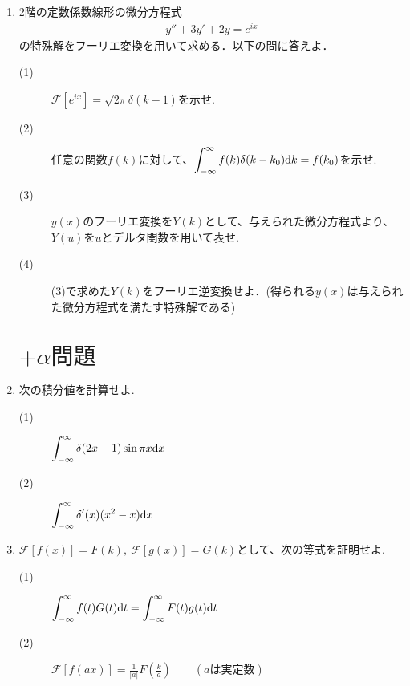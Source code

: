 \documentclass[11pt]{jsarticle}
\begin{document}
\begin{enumerate}
\newpage
\item 2階の定数係数線形の微分方程式
\begin{eqnarray*}
\label{a}
y''+3y'+2y=e^{ix}
\end{eqnarray*}
の特殊解をフーリエ変換を用いて求める．以下の問に答えよ．
\begin{description}
\item[(1)] $\mathcal{F}[e^{ix}]=\sqrt{2\pi}\delta (k-1)$を示せ.
\item[(2)] 任意の関数$f(k)$に対して、$\displaystyle{\int_{-\infty}^{\infty} f(k)\delta (k-k_0){\rm d}k=f(k_0)}$を示せ.
\newpage
\item[(3)] $y(x)$のフーリエ変換を$Y(k)$として、与えられた微分方程式より、$Y(u)$を$u$とデルタ関数を用いて表せ.
\item[(4)] (3)で求めた$Y(k)$をフーリエ逆変換せよ．(得られる$y(x)$は与えられた微分方程式を満たす特殊解である)
\end{description}



\newpage
\section*{$+\alpha 問題$}
\item 次の積分値を計算せよ.\\
\begin{description}
\item[(1)] $\displaystyle{\int_{-\infty}^{\infty} \delta (2x-1)\sin{\pi x} {\rm d}x}$
\vspace{80mm}
\item[(2)] $\displaystyle{\int_{-\infty}^{\infty} \delta '(x)(x^2-x) {\rm d}x}$
\end{description}

\newpage
\item $\mathcal{F}[f(x)]=F(k),~\mathcal{F}[g(x)]=G(k)$として、次の等式を証明せよ.\\
\begin{description}
\item[(1)] \hspace{0.5cm}
$\displaystyle{\int_{-\infty}^{\infty} f(t)G(t){\rm d}t = \int_{-\infty}^{\infty} F(t)g(t){\rm d}t}$

\vspace{80mm}
\item[(2)] \hspace{0.5cm}
$\displaystyle{\mathcal{F}[f(ax)]=\frac{1}{|a|}F(\frac{k}{a})}\qquad (aは実定数)$
\end{description}


\end{enumerate}
\end{document}
